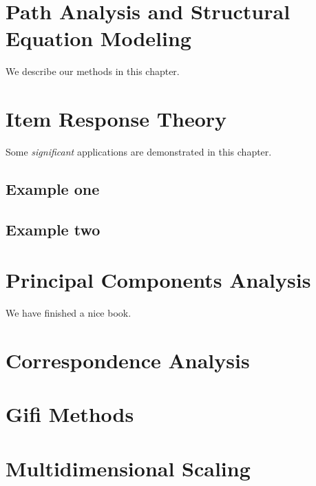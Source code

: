 \documentclass[
]{book}
\begin{document}
\hypertarget{path-analysis-and-structural-equation-modeling}{%
\chapter{Path Analysis and Structural Equation Modeling}\label{path-analysis-and-structural-equation-modeling}}

We describe our methods in this chapter.

\hypertarget{item-response-theory}{%
\chapter{Item Response Theory}\label{item-response-theory}}

Some \emph{significant} applications are demonstrated in this chapter.

\hypertarget{example-one}{%
\section{Example one}\label{example-one}}

\hypertarget{example-two}{%
\section{Example two}\label{example-two}}

\hypertarget{principal-components-analysis-1}{%
\chapter{Principal Components Analysis}\label{principal-components-analysis-1}}

We have finished a nice book.

\hypertarget{correspondence-analysis}{%
\chapter{Correspondence Analysis}\label{correspondence-analysis}}

\hypertarget{gifi-methods}{%
\chapter{Gifi Methods}\label{gifi-methods}}

\hypertarget{multidimensional-scaling}{%
\chapter{Multidimensional Scaling}\label{multidimensional-scaling}}
\end{document}
